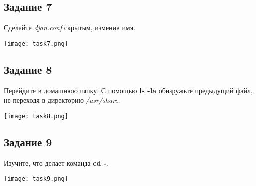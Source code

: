 \documentclass[12pt, a4paper]{report}
\begin{document}
			\subsection*{Задание 7}
			Сделайте \textit{djan.conf} скрытым, изменив имя.
			\lstset{style=mystyle}
			
			\begin{center}
				\texttt{[image: task7.png]}
			\end{center}
	
			\subsection*{Задание 8}
			Перейдите в домашнюю папку. С помощью \textbf{ls -la} обнаружьте предыдущий файл, не переходя в директорию \textit{/usr/share}.
			\lstset{style=mystyle}
			
			\begin{center}
				\texttt{[image: task8.png]}
			\end{center}
	
			\subsection*{Задание 9}
			Изучите, что делает команда \textbf{cd -}.
			\lstset{style=mystyle}
			
			\begin{center}
				\texttt{[image: task9.png]}
			\end{center}
	
\end{document}
